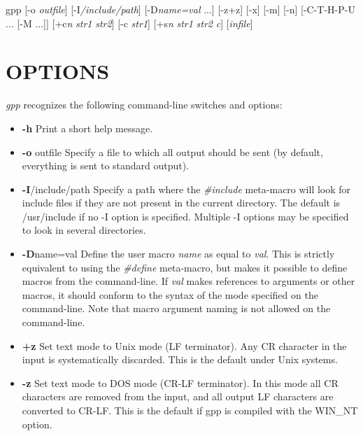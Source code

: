 \begin{PRE}
  gpp [-o {\it outfile}] [-I{\it /include/path}] [-D{\it name=val} ...]
      [-z{\htmlBar}+z] [-x] [-m] [-n] [-C{\htmlBar}-T{\htmlBar}-H{\htmlBar}-P{\htmlBar}-U ... [-M ...]] 
      [+c{\it {\htmlLt}n{\htmlGt}} {\it str1} {\it str2}] [-c {\it str1}]
      [+s{\it {\htmlLt}n{\htmlGt}} {\it str1} {\it str2} {\it c}] [{\it infile}]
\end{PRE}

\htmlHR

\section{OPTIONS}

{\it gpp} recognizes the following command-line switches and options: 

\begin{itemize}

\item {\bf -h}\htmlBR
Print a short help message. 

\item {\bf -o }outfile\htmlBR
Specify a file to which all output should be sent (by default, everything is
sent to standard output). 

\item {\bf -I}/include/path\htmlBR
Specify a path where the {\it \#include} meta-macro will look for include
files if they are not present in the current directory. The default is
/usr/include if no -I option is specified. Multiple -I options may be
specified to look in several directories. 

\item {\bf -D}name=val\htmlBR
Define the user macro {\it name} as equal to {\it val}. This is strictly
equivalent to using the {\it \#define} meta-macro, but makes it possible to
define macros from the command-line. If {\it val} makes references to
arguments or other macros, it should conform to the syntax of the mode
specified on the command-line. Note that macro argument naming is not allowed
on the command-line. 

\item {\bf +z}\htmlBR
Set text mode to Unix mode (LF terminator). Any CR character in the input is
systematically discarded. This is the default under Unix systems. 

\item {\bf -z}\htmlBR
Set text mode to DOS mode (CR-LF terminator). In this mode all CR characters
are removed from the input, and all output LF characters are converted to
CR-LF. This is the default if gpp is compiled with the WIN\_NT option. 


\end{itemize}
